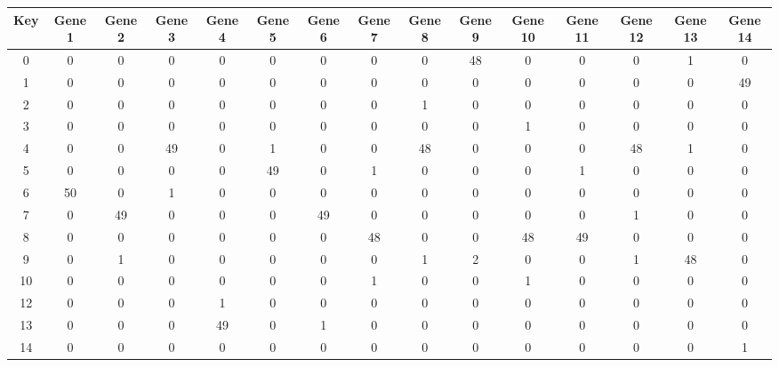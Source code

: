 \begin{tabular}{|c|c|c|c|c|c|c|c|c|c|c|c|c|c|c|}
\hline
Key & Gene 1 & Gene 2 & Gene 3 & Gene 4 & Gene 5 & Gene 6 & Gene 7 & Gene 8 & Gene 9 & Gene 10 & Gene 11 & Gene 12 & Gene 13 & Gene 14 \\
\hline
0 & 0 & 0 & 0 & 0 & 0 & 0 & 0 & 0 & 48 & 0 & 0 & 0 & 1 & 0 \\
1 & 0 & 0 & 0 & 0 & 0 & 0 & 0 & 0 & 0 & 0 & 0 & 0 & 0 & 49 \\
2 & 0 & 0 & 0 & 0 & 0 & 0 & 0 & 1 & 0 & 0 & 0 & 0 & 0 & 0 \\
3 & 0 & 0 & 0 & 0 & 0 & 0 & 0 & 0 & 0 & 1 & 0 & 0 & 0 & 0 \\
4 & 0 & 0 & 49 & 0 & 1 & 0 & 0 & 48 & 0 & 0 & 0 & 48 & 1 & 0 \\
5 & 0 & 0 & 0 & 0 & 49 & 0 & 1 & 0 & 0 & 0 & 1 & 0 & 0 & 0 \\
6 & 50 & 0 & 1 & 0 & 0 & 0 & 0 & 0 & 0 & 0 & 0 & 0 & 0 & 0 \\
7 & 0 & 49 & 0 & 0 & 0 & 49 & 0 & 0 & 0 & 0 & 0 & 1 & 0 & 0 \\
8 & 0 & 0 & 0 & 0 & 0 & 0 & 48 & 0 & 0 & 48 & 49 & 0 & 0 & 0 \\
9 & 0 & 1 & 0 & 0 & 0 & 0 & 0 & 1 & 2 & 0 & 0 & 1 & 48 & 0 \\
10 & 0 & 0 & 0 & 0 & 0 & 0 & 1 & 0 & 0 & 1 & 0 & 0 & 0 & 0 \\
12 & 0 & 0 & 0 & 1 & 0 & 0 & 0 & 0 & 0 & 0 & 0 & 0 & 0 & 0 \\
13 & 0 & 0 & 0 & 49 & 0 & 1 & 0 & 0 & 0 & 0 & 0 & 0 & 0 & 0 \\
14 & 0 & 0 & 0 & 0 & 0 & 0 & 0 & 0 & 0 & 0 & 0 & 0 & 0 & 1 \\
\hline
\end{tabular}